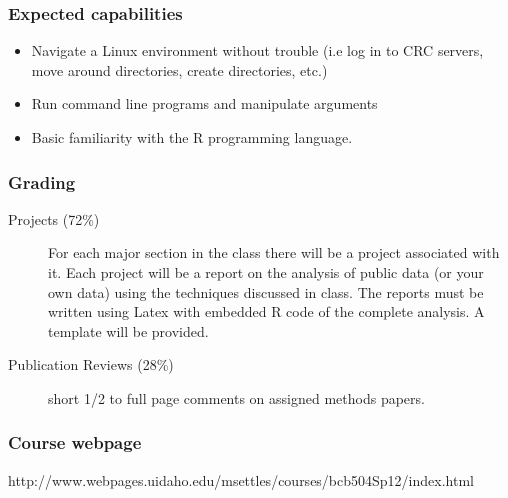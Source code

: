 \documentclass[pdf]{beamer}
\begin{document}
\begin{frame}
	\frametitle{Expected capabilities}
	\begin{itemize}
		\item Navigate a Linux environment without trouble (i.e log in to CRC servers, move around directories, create directories, etc.)
		\item Run command line programs and manipulate arguments
		\item Basic familiarity with the R programming language.
	\end{itemize}
\end{frame}
\begin{frame}
	\frametitle{Grading}
	\begin{description}
		\item[Projects (72\%)] For each major section in the class there will be a project associated with it. Each project will be a report on the analysis of public data (or your own data) using the techniques discussed in class. The reports must be written using Latex with embedded R code of the complete analysis. A template will be provided.
		\item[Publication Reviews (28\%)] short 1/2 to full page comments on assigned methods papers. 
	\end{description}
\end{frame}
\begin{frame}
	\frametitle{Course webpage}
	http://www.webpages.uidaho.edu/msettles/courses/bcb504Sp12/index.html
\end{frame}
\end{document}
